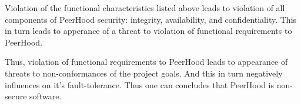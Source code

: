 %
Violation of the functional characteristics listed above leads to violation of all components of PeerHood security: integrity, availability, and confidentiality. 
%
This in turn leads to apperance of a threat to violation of functional requirements to PeerHood. 

%
Thus, violation of functional requirements to PeerHood leads to appearance of threats to non-conformances of the project goals. 
%
And this in turn negatively influences on it's fault-tolerance. 
%
Thus one can concludes that PeerHood is non-secure software. 